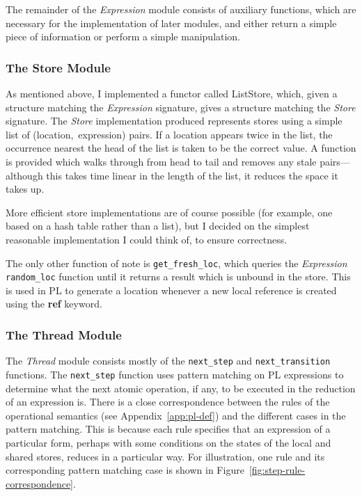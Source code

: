 \documentclass[12pt,a4paper,twoside,openright]{report}
\begin{document}
The remainder of the \emph{Expression} module
consists of auxiliary functions, which are
necessary for the implementation of later
modules, and either return a simple piece
of information or perform a simple manipulation.

\subsubsection{The Store Module}
As mentioned above, I implemented a functor
called ListStore, which, given a structure
matching the \emph{Expression} signature,
gives a structure matching the \emph{Store}
signature. The \emph{Store} implementation produced
represents stores using a simple list of
(location,~expression) pairs. If a location
appears twice in the list, the occurrence
nearest the head of the list is taken to be
the correct value. A function is provided
which walks through from head to tail and
removes any stale pairs---although this
takes time linear in the length of the list,
it reduces the space it takes up.

More efficient store implementations are of
course possible (for example, one based on
a hash table rather than a list), but
I decided on the simplest reasonable
implementation I could think of, to
ensure correctness.

The only other function of note is
\texttt{get\_fresh\_loc},
which queries the \emph{Expression} \texttt{random\_loc}
function until it returns a result which is
unbound in the store. This is used in PL
to generate a location
whenever a new local reference is created using the
\textbf{ref} keyword.

\subsubsection{The Thread Module}
The \emph{Thread} module consists mostly of
the \texttt{next\_step} and \texttt{next\_transition}
functions. The \texttt{next\_step} function uses pattern
matching on PL expressions to determine what the next atomic
operation, if any, to be executed in the reduction
of an expression is. There is a close correspondence
between the
rules of the operational semantics (see Appendix~\ref{app:pl-def})
and the different cases in the pattern matching. This is
because each rule specifies that an expression of a
particular form, perhaps with some conditions on the
states of the local and shared stores, reduces in a
particular way. For illustration, one rule and its
corresponding pattern matching case is shown in 
Figure~\ref{fig:step-rule-correspondence}.
\end{document}
